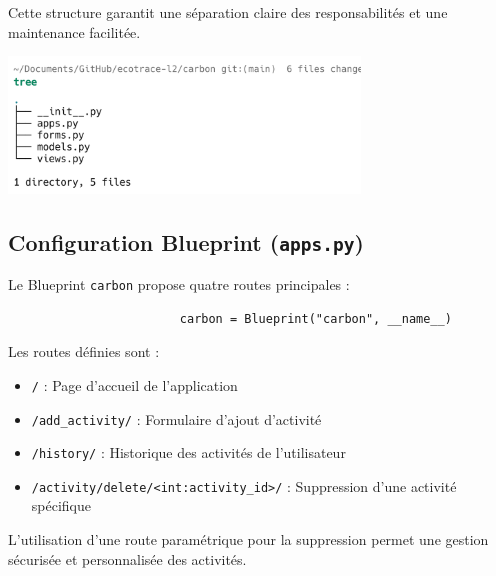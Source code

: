 \documentclass[a4paper,11pt]{article}
\begin{document}
            \noindent Cette structure garantit une séparation claire des responsabilités et une maintenance facilitée.

            \begin{center}
                \includegraphics[width=0.7\textwidth]{captures/carbon/img1.png}
            \end{center}

            \subsection{Configuration Blueprint (\texttt{apps.py})}
                \noindent Le Blueprint \texttt{carbon} propose quatre routes principales :

                \begin{tcolorbox}[colback=lightgray!6, colframe=black, left=-35mm, right=5mm, top=2mm, bottom=0mm, boxrule=0.1mm]
                    \begin{verbatim}
                        carbon = Blueprint("carbon", __name__)
                    \end{verbatim}
                \end{tcolorbox}

                \noindent Les routes définies sont :

                \begin{itemize}
                    \item \texttt{/} : Page d'accueil de l'application
                    \item \texttt{/add\_activity/} : Formulaire d'ajout d'activité
                    \item \texttt{/history/} : Historique des activités de l'utilisateur
                    \item \texttt{/activity/delete/<int:activity\_id>/} : Suppression d'une activité spécifique
                \end{itemize}

                \noindent L'utilisation d'une route paramétrique pour la suppression permet une gestion sécurisée et personnalisée des activités.
\end{document}
